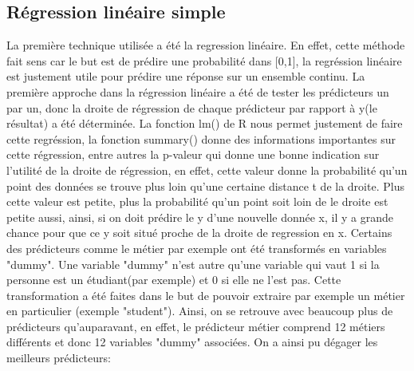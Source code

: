 \documentclass[11pt]{article}
\begin{document}
	\subsection{Régression linéaire simple}
	La première technique utilisée a été la regression linéaire. En effet, cette méthode fait sens car le but est de prédire une probabilité dans [0,1], la regréssion linéaire est justement utile pour prédire une réponse sur un ensemble continu. 
	La première approche dans la régression linéaire a été de tester les prédicteurs un par un, donc la droite de régression de chaque prédicteur par rapport à y(le résultat) a été déterminée. La fonction lm() de R nous permet justement de faire cette regréssion, la fonction summary() donne des informations importantes sur cette régression, entre autres la p-valeur qui donne une bonne indication sur l'utilité de la droite de régression, en effet, cette valeur donne la probabilité qu'un point des données se trouve plus loin qu'une certaine distance t de la droite. Plus cette valeur est petite, plus la probabilité qu'un point soit loin de le droite est petite aussi, ainsi, si on doit prédire le y d'une nouvelle donnée x, il y a grande chance pour que ce y soit situé proche de la droite de regression en x. 
	Certains des prédicteurs comme le métier par exemple ont été transformés en variables "dummy". Une variable "dummy" n'est autre qu'une variable qui vaut 1 si la personne est un étudiant(par exemple) et 0 si elle ne l'est pas. Cette transformation a été faites dans le but de pouvoir extraire par exemple un métier en particulier (exemple "student"). Ainsi, on se retrouve avec beaucoup plus de prédicteurs qu'auparavant, en effet, le prédicteur métier comprend 12 métiers différents et donc 12 variables "dummy" associées.
	On a ainsi pu dégager les meilleurs prédicteurs: 
\end{document}
